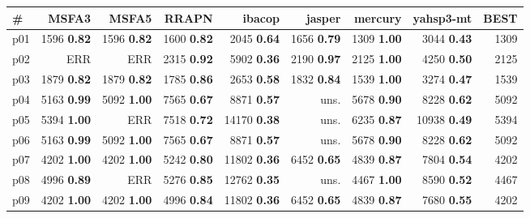 \begin{tabular}{|l|rrrrrrr|r|}
\hline
\textbf{\#} & \textbf{MSFA3} & \textbf{MSFA5} & \textbf{RRAPN} & \textbf{ibacop} & \textbf{jasper} & \textbf{mercury} & \textbf{yahsp3-mt} & \textbf{BEST}\\
\hline
p01 & {\footnotesize 1596} \textbf{0.82} & {\footnotesize 1596} \textbf{0.82} & {\footnotesize 1600} \textbf{0.82} & {\footnotesize 2045} \textbf{0.64} & {\footnotesize 1656} \textbf{0.79} & {\footnotesize 1309} \textbf{1.00} & {\footnotesize 3044} \textbf{0.43} & 1309\\
p02 & ERR & ERR & {\footnotesize 2315} \textbf{0.92} & {\footnotesize 5902} \textbf{0.36} & {\footnotesize 2190} \textbf{0.97} & {\footnotesize 2125} \textbf{1.00} & {\footnotesize 4250} \textbf{0.50} & 2125\\
p03 & {\footnotesize 1879} \textbf{0.82} & {\footnotesize 1879} \textbf{0.82} & {\footnotesize 1785} \textbf{0.86} & {\footnotesize 2653} \textbf{0.58} & {\footnotesize 1832} \textbf{0.84} & {\footnotesize 1539} \textbf{1.00} & {\footnotesize 3274} \textbf{0.47} & 1539\\
p04 & {\footnotesize 5163} \textbf{0.99} & {\footnotesize 5092} \textbf{1.00} & {\footnotesize 7565} \textbf{0.67} & {\footnotesize 8871} \textbf{0.57} & uns. & {\footnotesize 5678} \textbf{0.90} & {\footnotesize 8228} \textbf{0.62} & 5092\\
p05 & {\footnotesize 5394} \textbf{1.00} & ERR & {\footnotesize 7518} \textbf{0.72} & {\footnotesize 14170} \textbf{0.38} & uns. & {\footnotesize 6235} \textbf{0.87} & {\footnotesize 10938} \textbf{0.49} & 5394\\
p06 & {\footnotesize 5163} \textbf{0.99} & {\footnotesize 5092} \textbf{1.00} & {\footnotesize 7565} \textbf{0.67} & {\footnotesize 8871} \textbf{0.57} & uns. & {\footnotesize 5678} \textbf{0.90} & {\footnotesize 8228} \textbf{0.62} & 5092\\
p07 & {\footnotesize 4202} \textbf{1.00} & {\footnotesize 4202} \textbf{1.00} & {\footnotesize 5242} \textbf{0.80} & {\footnotesize 11802} \textbf{0.36} & {\footnotesize 6452} \textbf{0.65} & {\footnotesize 4839} \textbf{0.87} & {\footnotesize 7804} \textbf{0.54} & 4202\\
p08 & {\footnotesize 4996} \textbf{0.89} & ERR & {\footnotesize 5276} \textbf{0.85} & {\footnotesize 12762} \textbf{0.35} & uns. & {\footnotesize 4467} \textbf{1.00} & {\footnotesize 8590} \textbf{0.52} & 4467\\
p09 & {\footnotesize 4202} \textbf{1.00} & {\footnotesize 4202} \textbf{1.00} & {\footnotesize 4996} \textbf{0.84} & {\footnotesize 11802} \textbf{0.36} & {\footnotesize 6452} \textbf{0.65} & {\footnotesize 4839} \textbf{0.87} & {\footnotesize 7680} \textbf{0.55} & 4202\\

\end{tabular}
